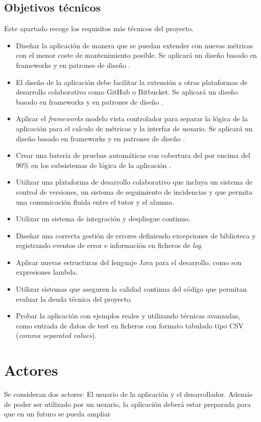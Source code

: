 \subsection{Objetivos técnicos}
Este apartado recoge los requisitos más técnicos del proyecto.
\begin{itemize}
	\tightlist
	\item Diseñar la aplicación de manera que se puedan extender con nuevas métricas con el menor coste de mantenimiento posible. Se aplicará un diseño basado en frameworks y en patrones de diseño \cite{gamma_patrones_2002}.
	\item El diseño de la aplicación debe facilitar la extensión a otras plataformas de desarrollo colaborativo como GitHub o Bitbucket. Se aplicará un diseño basado en frameworks y en patrones de diseño \cite{gamma_patrones_2002}.
	\item Aplicar el \textit{frameworks} modelo vista controlador para separar la lógica de la aplicación para el calculo de métricas y la interfaz de usuario.
	Se aplicará un diseño basado en frameworks y en patrones de diseño \cite{gamma_patrones_2002}.
	\item Crear una batería de pruebas automáticas con cobertura del por encima del 90\% en los subsistemas de lógica de la aplicación .
	\item Utilizar una plataforma de desarrollo colaborativo que incluya un sistema de control de versiones, un sistema de seguimiento de incidencias y que permita una comunicación fluida entre el tutor y el alumno.
	\item Utilizar un sistema de integración y despliegue continuo.
	\item Diseñar una correcta gestión de errores definiendo excepciones de biblioteca y registrando eventos de error e información en ficheros de \textit{log}. 
	\item Aplicar nuevas estructuras  del lenguaje Java para el desarrollo, como son expresiones lambda. 
	\item Utilizar sistemas que aseguren la calidad continua del código que permitan evaluar la deuda técnica del proyecto.
	\item Probar la aplicación con ejemplos reales y utilizando técnicas avanzadas, como entrada de datos de test en ficheros con formato tabulado tipo CSV (\textit{comma separated values}). 	
\end{itemize}

\section{Actores}
Se consideran dos actores: El usuario de la aplicación y el desarrollador. Además de poder ser utilizado por un usuario, la aplicación deberá estar preparada para que en un futuro se pueda ampliar 	
